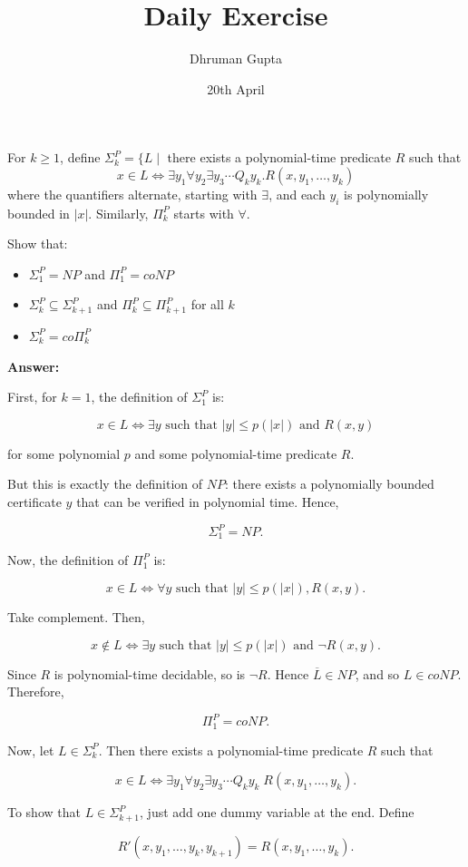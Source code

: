 \documentclass[11pt]{article}
\title{Daily Exercise}
\author{Dhruman Gupta}
\date{20th April}
\begin{document}

For $k \geq 1$, define $\Sigma_k^P = \{ L \mid$ there exists a polynomial-time predicate $R$ such that 
\[
x \in L \iff \exists y_1 \forall y_2 \exists y_3 \cdots Q_k y_k. R(x, y_1, \dots, y_k)
\]
where the quantifiers alternate, starting with $\exists$, and each $y_i$ is polynomially bounded in $|x|$. Similarly, $\Pi_k^P$ starts with $\forall$.

Show that:
\begin{itemize}
    \item $\Sigma_1^P = NP$ and $\Pi_1^P = coNP$
    \item $\Sigma_k^P \subseteq \Sigma_{k+1}^P$ and $\Pi_k^P \subseteq \Pi_{k+1}^P$ for all $k$
    \item $\Sigma_k^P = co\Pi_k^P$
\end{itemize}

\textbf{Answer:}

First, for $k = 1$, the definition of $\Sigma_1^P$ is:

\[
x \in L \iff \exists y \text{ such that } |y| \leq p(|x|) \text{ and } R(x,y)
\]

for some polynomial $p$ and some polynomial-time predicate $R$.

But this is exactly the definition of $NP$: there exists a polynomially bounded certificate $y$ that can be verified in polynomial time. Hence,

\[
\Sigma_1^P = NP.
\]

Now, the definition of $\Pi_1^P$ is:

\[
x \in L \iff \forall y \text{ such that } |y| \leq p(|x|), R(x,y).
\]

Take complement. Then,

\[
x \notin L \iff \exists y \text{ such that } |y| \leq p(|x|) \text{ and } \neg R(x,y).
\]

Since $R$ is polynomial-time decidable, so is $\neg R$. Hence $\overline{L} \in NP$, and so $L \in coNP$. Therefore,

\[
\Pi_1^P = coNP.
\]

Now, let $L \in \Sigma_k^P$. Then there exists a polynomial-time predicate $R$ such that

\[
x \in L \iff \exists y_1 \forall y_2 \exists y_3 \cdots Q_k y_k \; R(x,y_1,\dots,y_k).
\]

To show that $L \in \Sigma_{k+1}^P$, just add one dummy variable at the end. Define

\[
R'(x,y_1,\dots,y_k,y_{k+1}) = R(x,y_1,\dots,y_k).
\]
\end{document}
